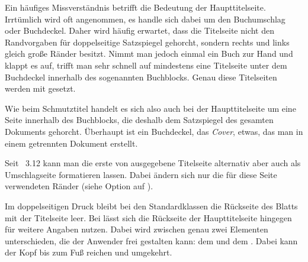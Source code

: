 \begin{Explain}
  Ein häufiges Missverständnis betrifft die Bedeutung der
  Haupttitelseite. Irrtümlich wird oft angenommen, es handle sich dabei um den
  Buchumschlag oder Buchdeckel. Daher wird
  häufig erwartet, dass die Titelseite nicht den Randvorgaben für
  doppelseitige Satzspiegel gehorcht, sondern rechts und links gleich große
  Ränder besitzt. Nimmt man jedoch einmal ein Buch zur Hand und klappt es auf,
  trifft man sehr schnell auf mindestens eine Titelseite
  unter dem Buchdeckel innerhalb des sogenannten Buchblocks. Genau diese
  Titelseiten werden mit  gesetzt.

  Wie beim Schmutztitel handelt es sich also auch bei der Haupttitelseite um
  eine Seite innerhalb des Buchblocks, die deshalb dem Satzspiegel des
  gesamten Dokuments gehorcht. Überhaupt ist ein Buchdeckel, das \emph{Cover},
  etwas, das man in einem getrennten Dokument erstellt.%

  Seit \KOMAScript~3.12 kann man die erste von
   ausgegebene Titelseite
  alternativ aber auch als Umschlagseite formatieren lassen. Dabei ändern sich
  nur die für diese Seite verwendeten Ränder (siehe Option
   auf
  ).
\end{Explain}
%
\EndIndexGroup


\begin{Declaration}
\end{Declaration}%
Im doppelseitigen Druck bleibt bei
den Standardklassen die Rückseite des Blatts mit der Titelseite leer. Bei
{\KOMAScript} lässt sich die Rückseite der Haupttitelseite hingegen für
weitere Angaben nutzen. Dabei wird zwischen genau zwei Elementen
unterschieden, die der Anwender frei gestalten kann: dem
 und dem
. Dabei kann der Kopf bis zum Fuß reichen und
umgekehrt. %
%
\EndIndexGroup


